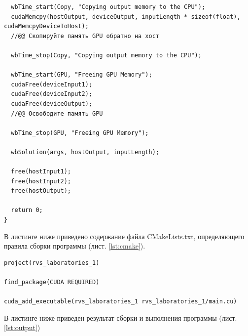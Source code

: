 \documentclass[14pt]{extarticle}
\newenvironment{code}{\captionsetup{type=listing, belowskip=-14pt plus 3pt minus 0pt}}{}
\begin{document}
\begin{code}
\begin{verbatim}
  wbTime_start(Copy, "Copying output memory to the CPU");
  cudaMemcpy(hostOutput, deviceOutput, inputLength * sizeof(float), cudaMemcpyDeviceToHost);
  //@@ Скопируйте память GPU обратно на хост

  wbTime_stop(Copy, "Copying output memory to the CPU");

  wbTime_start(GPU, "Freeing GPU Memory");
  cudaFree(deviceInput1);
  cudaFree(deviceInput2);
  cudaFree(deviceOutput);
  //@@ Освободите память GPU

  wbTime_stop(GPU, "Freeing GPU Memory");

  wbSolution(args, hostOutput, inputLength);

  free(hostInput1);
  free(hostInput2);
  free(hostOutput);

  return 0;
}
\end{verbatim}
\end{code}

\pagebreak

В листинге ниже приведено содержание файла CMakeLists.txt, определяющего правила сборки программы (лист. \ref{lst:cmake}).

\begin{code}    
\caption{Содержание CMakeLists.txt\label{lst:cmake}}
\begin{verbatim}
project(rvs_laboratories_1)

find_package(CUDA REQUIRED)

cuda_add_executable(rvs_laboratories_1 rvs_laboratories_1/main.cu)
\end{verbatim}
\end{code}

В листинге ниже приведен результат сборки и выполнения программы (лист. \ref{lst:output})
\end{document}
